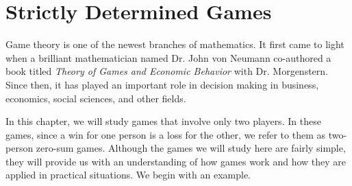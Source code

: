 \section{Strictly Determined Games}

Game theory is one of the newest branches of mathematics. It first came to light when a brilliant mathematician named Dr. John von Neumann co-authored a book titled \textit{Theory of Games and Economic Behavior} with Dr. Morgenstern. Since then, it has played an important role in decision making in business, economics, social sciences, and other fields.

In this chapter, we will study games that involve only two players. In these games, since a win for one person is a loss for the other, we refer to them as two-person zero-sum games. Although the games we will study here are fairly simple, they will provide us with an understanding of how games work and how they are applied in practical situations. We begin with an example.

